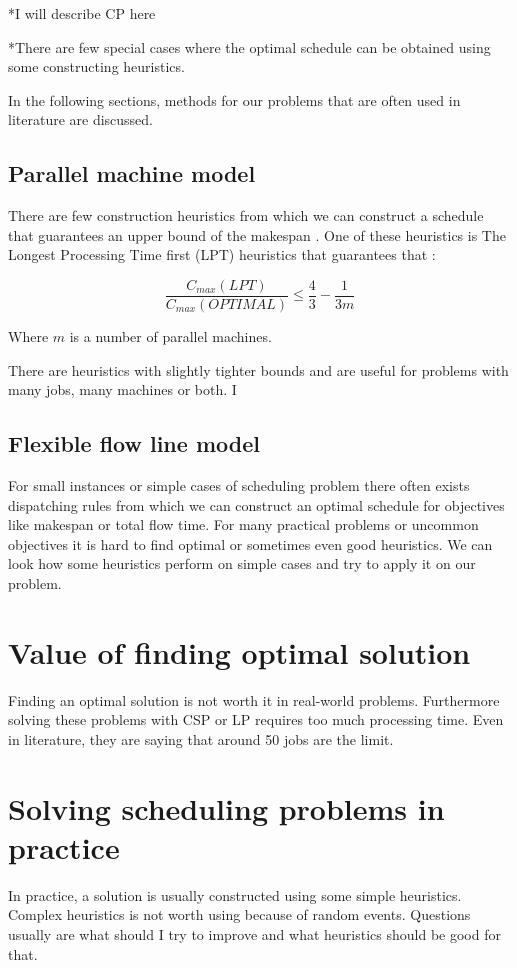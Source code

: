 \documentclass{ctuthesis}
\begin{document}
*I will describe CP here

*There are few special cases where the optimal schedule can be obtained using some constructing heuristics. 

In the following sections, methods for our problems that are often used in literature are discussed.

\subsection{Parallel machine model}

There are few construction heuristics from which we can construct a schedule that guarantees an upper bound of the makespan \cite{gram}. One of these heuristics is The Longest Processing Time first (LPT) heuristics \cite{pinedo} that guarantees that \cite{gram1969}:

\begin{equation}
\dfrac{C_{max}(LPT)}{C_{max}(OPTIMAL)} \leq \dfrac{4}{3} - \dfrac{1}{3m}
\end{equation}

Where $m$ is a number of parallel machines.

There are heuristics with slightly tighter bounds and are useful for problems with many jobs, many machines or both. I 

\subsection{Flexible flow line model}

For small instances or simple cases of scheduling problem there often exists dispatching rules from which we can construct an optimal schedule for objectives like makespan or total flow time. For many practical problems or uncommon objectives it is hard to find optimal or sometimes even good heuristics. We can look how some heuristics perform on simple cases and try to apply it on our problem. 

\section{Value of finding optimal solution}
Finding an optimal solution is not worth it in real-world problems. Furthermore solving these problems with CSP or LP requires too much processing time. Even in literature, they are saying that around 50 jobs are the limit. 
\section{Solving scheduling problems in practice}
In practice, a solution is usually constructed using some simple heuristics. Complex heuristics is not worth using because of random events. Questions usually are what should I try to improve and what heuristics should be good for that. 
\end{document}
